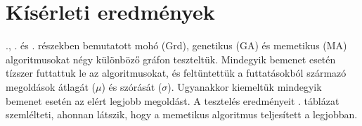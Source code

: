 \section{Kísérleti eredmények}


., . és . részekben bemutatott mohó (Grd), genetikus (GA) és memetikus (MA) algoritmusokat négy különböző gráfon teszteltük.
Mindegyik bemenet esetén tízszer futtattuk le az algoritmusokat, és feltüntettük a futtatásokból származó megoldások átlagát ($\mu$) és szórását ($\sigma$).
Ugyanakkor kiemeltük mindegyik bemenet esetén az elért legjobb megoldást. A tesztelés eredményeit . táblázat szemlélteti, ahonnan látszik, hogy a memetikus algoritmus teljesített a legjobban.

\begin{table}[b]
  \centering
  \caption{
    A mohó (Grd), genetikus (GA) és memetikus (MA) algoritmusok adta eredmények.
  }\label{tab:CNDP_RESULTS}
\end{table}
